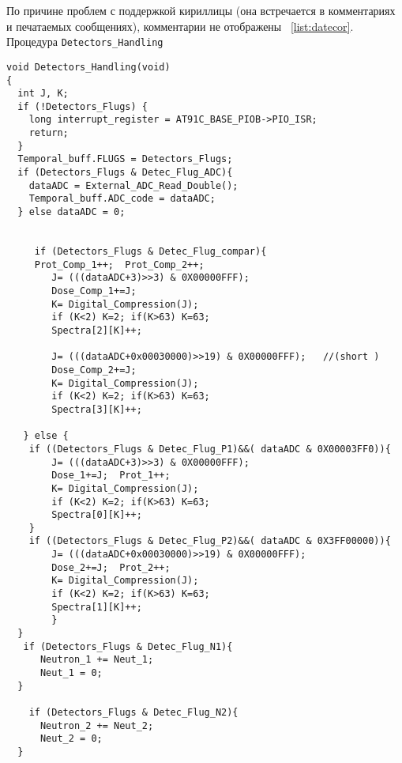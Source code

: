 По причине проблем с поддержкой кириллицы (она встречается в комментариях и
печатаемых сообщениях), комментарии не отображены ~\ref{list:datecor}.
Процедура \texttt{Detectors\_Handling} 
\label{list:Detectors_Handling}
\begin{lstlisting}[language={[ISO]C++}]
void Detectors_Handling(void)
{  
  int J, K;
  if (!Detectors_Flugs) {
    long interrupt_register = AT91C_BASE_PIOB->PIO_ISR;    
    return;
  }  
  Temporal_buff.FLUGS = Detectors_Flugs;
  if (Detectors_Flugs & Detec_Flug_ADC){
    dataADC = External_ADC_Read_Double();
    Temporal_buff.ADC_code = dataADC;
  } else dataADC = 0;

	
     if (Detectors_Flugs & Detec_Flug_compar){
     Prot_Comp_1++;  Prot_Comp_2++;  
        J= (((dataADC+3)>>3) & 0X00000FFF);
        Dose_Comp_1+=J;
        K= Digital_Compression(J);
        if (K<2) K=2; if(K>63) K=63;
        Spectra[2][K]++;
    
        J= (((dataADC+0x00030000)>>19) & 0X00000FFF);   //(short )
        Dose_Comp_2+=J;
        K= Digital_Compression(J);
        if (K<2) K=2; if(K>63) K=63;
        Spectra[3][K]++;

   } else {
	if ((Detectors_Flugs & Detec_Flug_P1)&&( dataADC & 0X00003FF0)){
        J= (((dataADC+3)>>3) & 0X00000FFF);
        Dose_1+=J;  Prot_1++;
        K= Digital_Compression(J);
        if (K<2) K=2; if(K>63) K=63;
        Spectra[0][K]++;
	}
	if ((Detectors_Flugs & Detec_Flug_P2)&&( dataADC & 0X3FF00000)){
        J= (((dataADC+0x00030000)>>19) & 0X00000FFF);
        Dose_2+=J;  Prot_2++;
        K= Digital_Compression(J);
        if (K<2) K=2; if(K>63) K=63;
        Spectra[1][K]++;
        }
  }
   if (Detectors_Flugs & Detec_Flug_N1){      
      Neutron_1 += Neut_1;
      Neut_1 = 0;
  } 
 
    if (Detectors_Flugs & Detec_Flug_N2){       
      Neutron_2 += Neut_2; 
      Neut_2 = 0;
  } 


\end{lstlisting}
